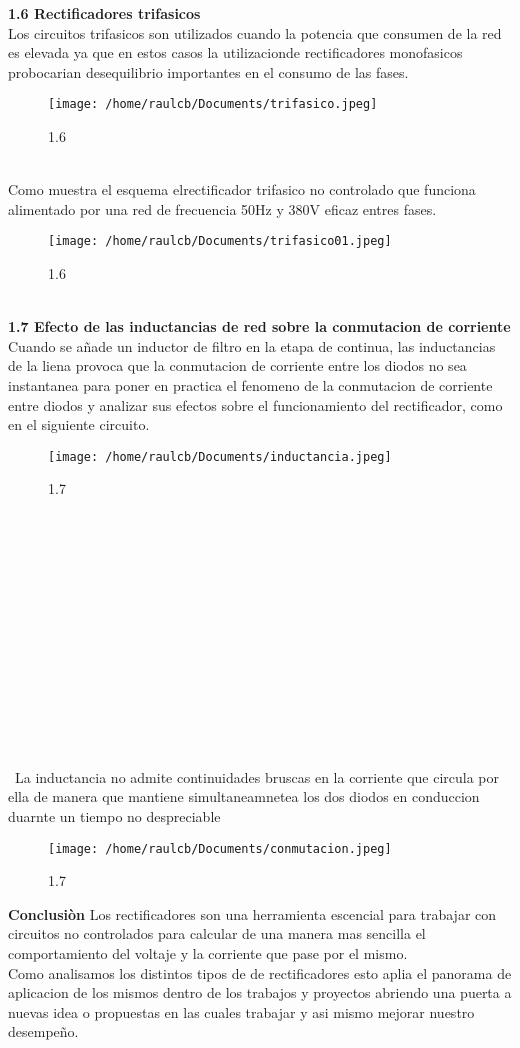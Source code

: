 \documentclass[11pt]{article}
\begin{document}
\textbf{1.6 Rectificadores trifasicos}
\\
Los circuitos trifasicos son utilizados cuando la potencia que consumen de la red es elevada ya que en estos casos la utilizacionde rectificadores monofasicos probocarian desequilibrio importantes en el consumo de las fases.
\begin{figure}[htp]
\centering
\texttt{[image: /home/raulcb/Documents/trifasico.jpeg]}
\caption{1.6}
\label{.}
\end{figure}
\\
Como muestra el esquema elrectificador trifasico no controlado que funciona alimentado por una red de frecuencia 50Hz y 380V eficaz entres fases. 
\begin{figure}[htp]
\centering
\texttt{[image: /home/raulcb/Documents/trifasico01.jpeg]}
\caption{1.6}
\label{.}
\end{figure}
\\
\textbf{1.7 Efecto de las inductancias de red sobre la conmutacion de corriente}
\\
Cuando se añade un inductor de filtro en la etapa de continua, las inductancias de la liena provoca que la conmutacion de corriente entre los diodos no sea instantanea para poner en practica el fenomeno de la conmutacion de corriente entre diodos y analizar sus efectos sobre el funcionamiento del rectificador, como en el siguiente circuito.
\begin{figure}[htp]
\centering
\texttt{[image: /home/raulcb/Documents/inductancia.jpeg]}
\caption{1.7}
\label{.}
\end{figure}
\\\\\\\\\\\\\\\\\\\\\\\\\\\
La inductancia no admite continuidades bruscas en la corriente que circula por ella de manera que mantiene simultaneamnetea los dos diodos en conduccion duarnte un tiempo no despreciable\begin{figure}[htp]
\centering
\texttt{[image: /home/raulcb/Documents/conmutacion.jpeg]}
\caption{1.7}
\label{.}
\end{figure}

\textbf{Conclusiòn}
Los rectificadores son una herramienta escencial para trabajar con circuitos no controlados para calcular de una manera mas sencilla el comportamiento del voltaje y la corriente que pase por el mismo.
 \\
 Como analisamos los distintos tipos de de rectificadores esto aplia el panorama de aplicacion de los mismos dentro de los trabajos y proyectos abriendo una puerta a nuevas idea o propuestas en las cuales trabajar y asi mismo mejorar nuestro desempeño.
\end{document}
